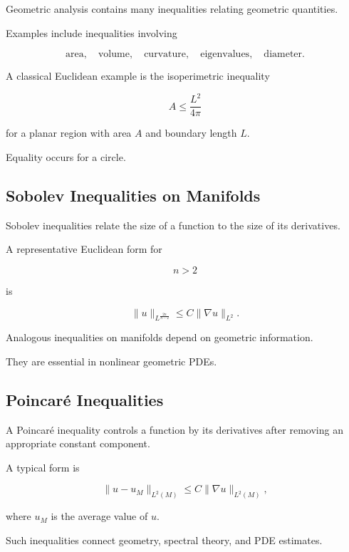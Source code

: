 Geometric analysis contains many inequalities relating geometric
quantities.

Examples include inequalities involving

\[
\boxed{
\text{area},
\quad
\text{volume},
\quad
\text{curvature},
\quad
\text{eigenvalues},
\quad
\text{diameter}.
}
\]

A classical Euclidean example is the isoperimetric inequality

\[
\boxed{
A
\leq
\frac{L^2}{4\pi}
}
\]

for a planar region with area \(A\) and boundary length \(L\).

Equality occurs for a circle.

\subsection{Sobolev Inequalities on Manifolds}
\label{subsec:sobolev-inequalities-manifolds}

Sobolev inequalities relate the size of a function to the size of its
derivatives.

A representative Euclidean form for

\[
n>2
\]

is

\[
\boxed{
\|u\|_{L^{\frac{2n}{n-2}}}
\leq
C
\|\nabla u\|_{L^2}.
}
\]

Analogous inequalities on manifolds depend on geometric information.

They are essential in nonlinear geometric PDEs.

\subsection{Poincar\'e Inequalities}
\label{subsec:poincare-inequalities-geometric}

A Poincar\'e inequality controls a function by its derivatives after
removing an appropriate constant component.

A typical form is

\[
\boxed{
\|u-u_M\|_{L^2(M)}
\leq
C
\|\nabla u\|_{L^2(M)},
}
\]

where \(u_M\) is the average value of \(u\).

Such inequalities connect geometry, spectral theory, and PDE estimates.

